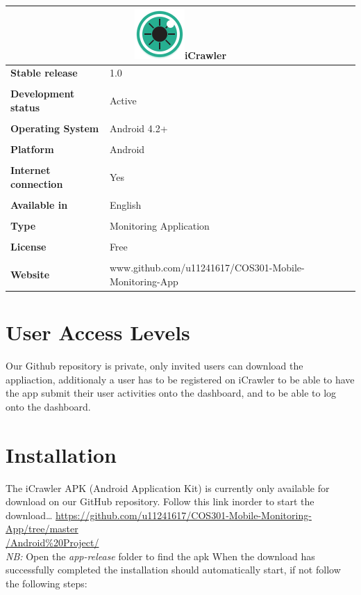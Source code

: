 \documentclass[hidelinks, 12pt, oneside]{article}
\begin{document}
	\begin{tabular}{ |l|l| }  \multicolumn{2}{|c|}{\includegraphics[width=0.1 \textwidth]{img/icon.png}iCrawler}
	 \\ \hline\noalign{\smallskip} \textbf{Stable release} & 1.0
	  \\\\ \noalign{\smallskip} \textbf{Development status}& Active
	  \\\\ \noalign{\smallskip}\textbf{Operating System}& Android 4.2+
	  \\\\ \noalign{\smallskip}\textbf{Platform}& Android
	  \\\\ \noalign{\smallskip}\textbf{Internet connection} & Yes
	  \\\\ \noalign{\smallskip}\textbf{Available in} & English
	  \\\\ \noalign{\smallskip}\textbf{Type}& Monitoring Application
	  \\\\ \noalign{\smallskip}\textbf{License}& Free
	  \\\\ \noalign{\smallskip}\textbf{Website}& www.github.com/u11241617/COS301-Mobile-Monitoring-App
	 \end{tabular}\newpage
	\section{User Access Levels}
		Our Github repository is private, only invited users can download the appliaction, additionaly a user has  to be registered on iCrawler to be able to have the app submit their user activities onto the dashboard, and to be able to log onto the dashboard.\newline
	\section{Installation}
	The iCrawler APK (Android Application Kit) is currently only available for download on our GitHub repository. Follow this link inorder 
	to start the download\dots\newline
		\href{url}{https://github.com/u11241617/COS301-Mobile-Monitoring-App/tree/master\\/Android\%20Project/}\\
		\emph{NB:} Open the \emph{app-release} folder to find the apk \newline \newline
		When the download has successfully completed the installation should automatically start, if not follow the following steps:\newline
	  
\end{document}
